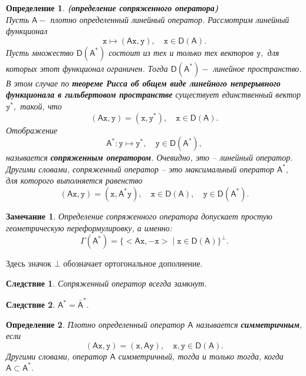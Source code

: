 \documentclass[12 pt, a4 paper]{article}
\theoremstyle{plain}   \newtheorem{Pro}{Задача}
\newtheorem{Def}{Определение}
\newtheorem{Rem}{Замечание}
\newtheorem{Cor}{Следствие}
\begin{document}
\begin{Def}
{\bfseries (определение сопряженного оператора)}\\
Пусть
$ \mathsf{A} - $
плотно определенный линейный оператор.
Рассмотрим линейный функционал
$$
  \mathtt{x} \mapsto (\mathsf{A}\mathtt{x},\mathtt{y}),
  \quad \mathtt{x} \in \mathsf{D}(\mathsf{A}).
$$
Пусть множество
$ \mathsf{D}(\mathsf{A}^{\ast}) $
состоит из тех и только тех векторов
$ \mathtt{y} , $
для которых этот функционал ограничен. Тогда
$ \mathsf{D}(\mathsf{A}^{\ast}) - $
линейное пространство. В этом случае по
{\bfseries теореме Рисса об общем виде линейного непрерывного
функционала в гильбертовом пространстве}
существует единственный вектор
$ \mathtt{y}^{\ast} , $
такой, что
$$
  (\mathsf{A}\mathtt{x},\mathtt{y})=
  (\mathtt{x},\mathtt{y}^{\ast}),
  \quad \mathtt{x} \in \mathsf{D}(\mathsf{A}) .
$$
Отображение
$$
  \mathsf{A}^{\ast}: \mathtt{y} \mapsto \mathtt{y}^{\ast},
  \quad \mathtt{y} \in \mathsf{D}(\mathsf{A}^{\ast}),
$$
называется
{\bfseries сопряженным оператором}.
Очевидно, это -- линейный
оператор.
\\
Другими словами, сопряженный оператор -- это максимальный оператор
$ \mathsf{A}^{\ast} , $
для которого выполняется равенство
$$
  (\mathsf{A}\mathtt{x},\mathtt{y})=
  (\mathtt{x},\mathsf{A}^{\ast}\mathtt{y}),
  \quad \mathtt{x} \in \mathsf{D}(\mathsf{A}),
  \quad \mathtt{y} \in \mathsf{D}(\mathsf{A}^{\ast}).
$$
\end{Def}
\begin{Rem}
Определение сопряженного оператора допускает простую
геометрическую переформулировку, а именно:
$$
  \Gamma (\mathsf{A}^{\ast})=
  \{ <\mathsf{A}\mathtt{x}, -\mathtt{x}> \; | \;
  \mathtt{x} \in \mathsf{D}(\mathsf{A}) \} ^{\bot}.
$$
\end{Rem}
Здесь значок
$ \bot $
обозначает ортогональное дополнение.
\begin{Cor}
Сопряженный оператор всегда замкнут.
\end{Cor}
\begin{Cor}
$ \mathsf{A}^{\ast}=\bar{\mathsf{A}}^{\ast} . $
\end{Cor}
\begin{Def}
Плотно определенный оператор
$ \mathsf{A} $
называется
{\bfseries симметричным},
если
$$
  (\mathsf{A}\mathtt{x},\mathtt{y})=
  (\mathtt{x},\mathsf{A}\mathtt{y}),
  \quad \mathtt{x}, \mathtt{y} \in \mathsf{D}(\mathsf{A}).
$$
Другими словами, оператор
$ \mathsf{A} $
симметричный, тогда и только тогда, когда
$ \mathsf{A} \subset \mathsf{A}^{\ast} . $
\end{Def}
\end{document}
